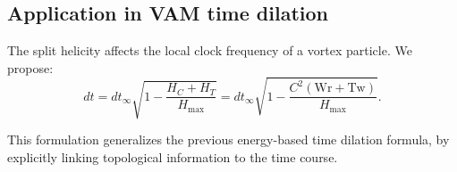 \subsection{Application in VAM time dilation}

The split helicity affects the local clock frequency of a vortex particle. We propose:
\begin{equation}
    dt = dt_\infty \sqrt{1 - \frac{H_C + H_T}{H_{\text{max}}}} = dt_\infty \sqrt{1 - \frac{C^2 (\text{Wr} + \text{Tw})}{H_{\text{max}}}}.
\end{equation}

This formulation generalizes the previous energy-based time dilation formula, by explicitly linking topological information to the time course.